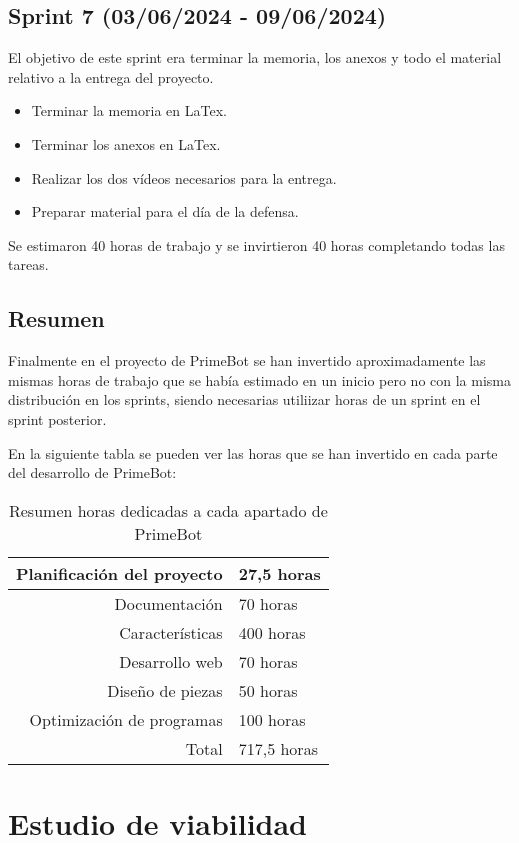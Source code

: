    \subsection {Sprint 7 (03/06/2024 - 09/06/2024)}
  El objetivo de este sprint era terminar la memoria, los anexos y todo el material relativo a la entrega del proyecto.
\begin{itemize}
\tightlist
\item
  Terminar la memoria en LaTex.
\item
  Terminar los anexos en LaTex.
\item
  Realizar los dos vídeos necesarios para la entrega.
  \item
  Preparar material para el día de la defensa.
\end{itemize}

Se estimaron 40 horas de trabajo y se invirtieron 40 horas completando todas las tareas.

\subsection {Resumen}
Finalmente en el proyecto de PrimeBot se han invertido aproximadamente las mismas horas de trabajo que se había estimado en un inicio pero no con la misma distribución en los sprints, siendo necesarias utiliizar horas de un sprint en el sprint posterior.

En la siguiente tabla se pueden ver las horas que se han invertido en cada parte del desarrollo de PrimeBot:

 \begin{table}[h]
\begin{tabular}{| r | l |}
\hline
Planificación del proyecto & 27,5 horas \\
\hline
Documentación & 70 horas \\
\hline
Características & 400 horas \\
\hline
Desarrollo web & 70 horas\\
\hline
Diseño de piezas & 50 horas\\
\hline
Optimización de programas & 100 horas \\
\hline
Total & 717,5 horas \\
\hline
\end{tabular}
   \caption{Resumen horas dedicadas a cada apartado de PrimeBot}
   \label{A.1}
 \end{table}

\section{Estudio de viabilidad}

